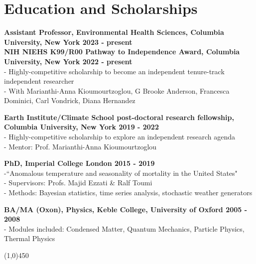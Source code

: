 \section*{Education and Scholarships}

\textbf{Assistant Professor, Environmental Health Sciences, Columbia University, New York \hfill 2023 - present}\\

\noindent \textbf{NIH NIEHS K99/R00 Pathway to Independence Award, Columbia University, New York \hfill 2022 - present}\\
- Highly-competitive scholarship to become an independent tenure-track independent researcher\\
- With Marianthi-Anna Kioumourtzoglou, G Brooke Anderson, Francesca Dominici, Carl Vondrick, Diana Hernandez \bigskip

\noindent \textbf{Earth Institute/Climate School post-doctoral research fellowship, Columbia University, New York \hfill 2019 - 2022}\\
- Highly-competitive scholarship to explore an independent research agenda\\
- Mentor: Prof. Marianthi-Anna Kioumourtzoglou \bigskip

\noindent \textbf{PhD, Imperial College London \hfill 2015 - 2019}\\
-``Anomalous temperature and seasonality of mortality in the United States"\\	 		
- Supervisors: Profs. Majid Ezzati \& Ralf Toumi\\
- Methods: Bayesian statistics, time series analysis, stochastic weather generators \bigskip

\noindent \textbf{BA/MA (Oxon), Physics, Keble College, University of Oxford \hfill 2005 - 2008}\\
- Modules included: Condensed Matter,  Quantum Mechanics, Particle Physics, Thermal Physics		                             
\begin{center} \line(1,0){450} \end{center}